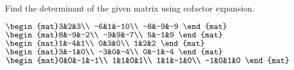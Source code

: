 
\begin{Exercise}[
name={},
title={}, 
difficulty=0,
origin={\cite{GH}}]
Find the determinant of the given matrix using cofactor expansion.
\begin{multicols}{2}
\Question $\begin{mat}3&2&3\\  -6&1&-10\\  -8&-9&-9 \end{mat}$
\Question $\begin{mat}8&-9&-2\\  -9&9&-7\\  5&-1&9 \end{mat}$
\Question $\begin{mat}1&-4&1\\  0&3&0\\  1&2&2 \end{mat}$
\Question $\begin{mat}3&-1&0\\  -3&0&-4\\  0&-1&-4 \end{mat}$
\Question $\begin{mat}0&0&-1&-1\\  1&1&0&1\\  1&1&-1&0\\  -1&0&1&0 \end{mat}$

\end{multicols}
\end{Exercise}
